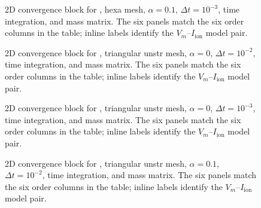 \begin{figure}[p]
\centering
{}
\caption{2D convergence block for , hexa mesh, $\alpha=0.1$, $\Delta t=10^{-3}$,  time integration, and  mass matrix. The six panels match the six order columns in the table; inline labels identify the $V_m$--$I_{\mathrm{ion}}$ model pair.}
\label{fig:results-2d-diagonaliion-hexa-alpha-1p0em01-1p0em03}
\end{figure}
\FloatBarrier

\begin{figure}[p]
\centering
{}
\caption{2D convergence block for , triangular unstr mesh, $\alpha=0$, $\Delta t=10^{-2}$,  time integration, and  mass matrix. The six panels match the six order columns in the table; inline labels identify the $V_m$--$I_{\mathrm{ion}}$ model pair.}
\label{fig:results-2d-diagonaliion-triangular-unstr-alpha-0p0e00-1p0em02}
\end{figure}
\FloatBarrier

\begin{figure}[p]
\centering
{}
\caption{2D convergence block for , triangular unstr mesh, $\alpha=0$, $\Delta t=10^{-3}$,  time integration, and  mass matrix. The six panels match the six order columns in the table; inline labels identify the $V_m$--$I_{\mathrm{ion}}$ model pair.}
\label{fig:results-2d-diagonaliion-triangular-unstr-alpha-0p0e00-1p0em03}
\end{figure}
\FloatBarrier

\begin{figure}[p]
\centering
{}
\caption{2D convergence block for , triangular unstr mesh, $\alpha=0.1$, $\Delta t=10^{-2}$,  time integration, and  mass matrix. The six panels match the six order columns in the table; inline labels identify the $V_m$--$I_{\mathrm{ion}}$ model pair.}
\label{fig:results-2d-diagonaliion-triangular-unstr-alpha-1p0em01-1p0em02}
\end{figure}
\FloatBarrier

